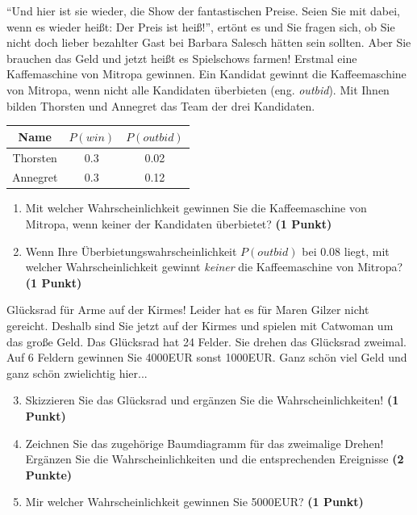 \documentclass[a4paper, 9pt]{scrartcl}\usepackage[]{graphicx}\usepackage[]{xcolor}
\begin{document}
"`Und hier ist sie wieder, die Show der fantastischen Preise. Seien Sie mit
dabei, wenn es wieder hei{\ss}t: Der Preis ist hei{\ss}!"', ert{\"o}nt es und Sie
fragen sich, ob Sie nicht doch lieber bezahlter Gast bei Barbara Salesch
h{\"a}tten sein sollten. Aber Sie brauchen das Geld und jetzt hei{\ss}t es
Spielschows farmen! Erstmal eine Kaffemaschine von Mitropa
gewinnen. Ein Kandidat gewinnt die Kaffeemaschine von Mitropa, wenn nicht alle
Kandidaten {\"u}berbieten (eng. \textit{outbid}). Mit Ihnen bilden
Thorsten und Annegret das Team der drei Kandidaten.

\begin{center}
\begin{tabular}{ccc}
  \toprule
  Name & $P(win)$ & $P(outbid)$\\
  \midrule
  Thorsten & 0.3 & 0.02\\
  Annegret & 0.3 & 0.12 \\
  \bottomrule
\end{tabular}
\end{center}

\begin{enumerate}
\item Mit welcher Wahrscheinlichkeit gewinnen Sie die Kaffeemaschine von
  Mitropa, wenn keiner der Kandidaten {\"u}berbietet? \textbf{(1 Punkt)}
\item Wenn Ihre {\"U}berbietungswahrscheinlichkeit $P(outbid)$ bei
  0.08 liegt, mit welcher Wahrscheinlichkeit gewinnt
  \textit{keiner} die Kaffeemaschine von Mitropa? \textbf{(1 Punkt)}
\end{enumerate}

Gl{\"u}cksrad f{\"u}r Arme auf der Kirmes! Leider hat es f{\"u}r Maren Gilzer nicht
gereicht. Deshalb sind Sie jetzt auf der Kirmes und spielen mit
Catwoman um das gro{\ss}e Geld. Das Gl{\"u}cksrad hat 24
Felder. Sie drehen das Gl{\"u}cksrad zweimal. Auf 6 Feldern
gewinnen Sie 4000EUR sonst 1000EUR. Ganz sch{\"o}n viel Geld
und ganz sch{\"o}n zwielichtig hier...

\begin{enumerate}
  \setcounter{enumi}{2}  
\item Skizzieren Sie das Gl{\"u}cksrad und erg{\"a}nzen Sie die
  Wahrscheinlichkeiten! \textbf{(1 Punkt)}
\item Zeichnen Sie das zugeh{\"o}rige Baumdiagramm f{\"u}r das zweimalige Drehen!
  Erg{\"a}nzen Sie die Wahrscheinlichkeiten und die entsprechenden Ereignisse
  \textbf{(2 Punkte)}
\item Mir welcher Wahrscheinlichkeit gewinnen Sie 5000EUR? \textbf{(1
    Punkt)}
\end{enumerate}
\end{document}
